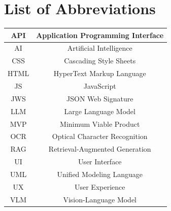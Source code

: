 \chapter*{List of Abbreviations}

\vspace{1cm}

\begin{center}
\renewcommand{\arraystretch}{1.8} 
\setlength{\tabcolsep}{2cm} 

\begin{tabular}{|c|c|}
\hline
API  & Application Programming Interface \\ \hline
AI   & Artificial Intelligence \\ \hline
CSS  & Cascading Style Sheets \\ \hline
HTML & HyperText Markup Language \\ \hline
JS   & JavaScript \\ \hline
JWS  & JSON Web Signature \\ \hline 
LLM  & Large Language Model \\ \hline
MVP  & Minimum Viable Product \\ \hline
OCR  & Optical Character Recognition \\ \hline
RAG  & Retrieval-Augmented Generation \\ \hline
UI   & User Interface \\ \hline
UML  & Unified Modeling Language \\ \hline
UX   & User Experience \\ \hline
VLM  & Vision-Language Model \\ \hline
\end{tabular}
\end{center}